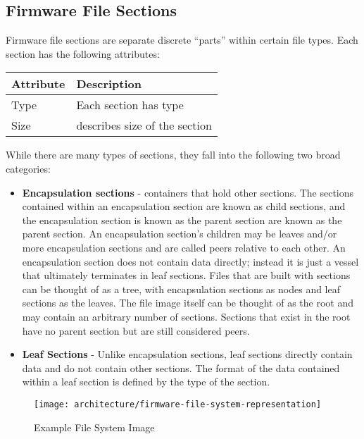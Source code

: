 \subsection{Firmware File Sections}
Firmware file sections are separate discrete “parts” within certain file types. Each section has the
following attributes:
\begin{table}[!htbp]
	\begin{tabular}{l | p{9cm}}
		Attribute & Description
		\\ \hline \hline
		Type & Each section has type 
		\\ \hline
		Size & describes size of the section
		\\ \hline
	\end{tabular}
\end{table}

While there are many types of sections, they fall into the following two broad categories:
\begin{itemize}
	\item \textbf{Encapsulation sections} - containers that hold other sections.
	The sections contained within an encapsulation section are known as child sections, and the encapsulation section is known as the parent section are known as the parent section. An encapsulation section's	children may be leaves and/or more encapsulation sections and are called peers relative to each other. An encapsulation section does not contain data directly; instead it is just a vessel that ultimately terminates in leaf sections. Files that are built with sections can be thought of as a tree, with encapsulation sections as nodes and	leaf sections as the leaves. The file image itself can be thought of as the root and may contain an arbitrary number of sections. Sections that exist in the root have no parent section but are still considered peers.
	\item \textbf{Leaf Sections} - Unlike encapsulation sections, leaf sections directly contain data and do not contain other sections. The format of the data contained within a leaf section is defined by the type of the section.
\end{itemize}

\begin{figure}[!htbp]
	\centering
	\texttt{[image: architecture/firmware-file-system-representation]}
	\caption{Example File System Image}\label{fig:architecture-firmware-file-system-representation}
\end{figure}

